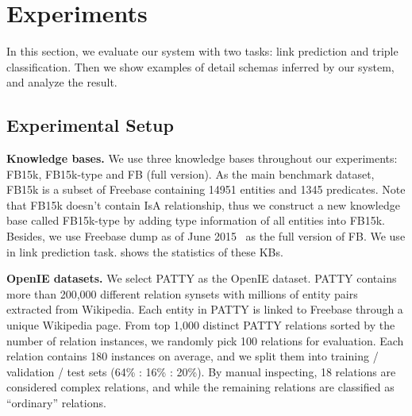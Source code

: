 \section{Experiments}
\label{sec:eval}

In this section, we evaluate our system with two tasks: link prediction
and triple classification.
Then we show examples of detail schemas inferred by our system, and analyze the result.

\subsection{Experimental Setup}

\textbf{Knowledge bases.} 
We use three knowledge bases throughout our experiments: 
FB15k, FB15k-type and FB (full version).
As the main benchmark dataset, FB15k \cite{bordes2013translating}
is a subset of Freebase containing 14951 entities and 1345 predicates.
Note that FB15k doesn't contain IsA relationship, thus we construct 
a new knowledge base called FB15k-type by adding type information 
of all entities into FB15k.
Besides, we use Freebase dump as of June 2015~\cite{freebase:datadumps} 
as the full version of FB.
We use  in link prediction task.
 shows the statistics of these KBs.

\noindent
\textbf{OpenIE datasets.}
We select PATTY \cite{nakashole2012patty} as the OpenIE dataset.
PATTY contains more than 200,000 different relation synsets
with millions of entity pairs extracted from Wikipedia.
Each entity in PATTY is linked to Freebase through a unique Wikipedia page.
From top 1,000 distinct PATTY relations sorted by the number of 
relation instances, we randomly pick 100 relations for evaluation.
Each relation contains 180 instances on average, and we split them into
training / validation / test sets (64\% : 16\% : 20\%).
By manual inspecting, 18 relations are considered complex relations, 
and while the remaining relations are classified as ``ordinary'' relations.

